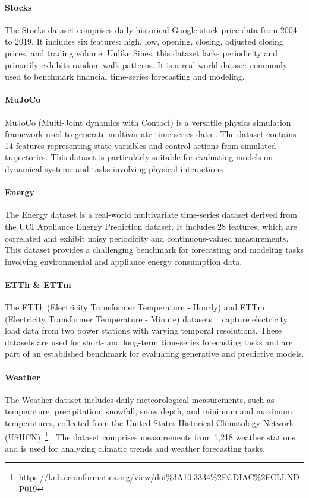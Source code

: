 \documentclass{article}
\theoremstyle{plain}
\theoremstyle{definition}
\theoremstyle{remark}
\begin{document}
\paragraph{Stocks} 
The Stocks dataset comprises daily historical Google stock price data from 2004 to 2019. It includes six features: high, low, opening, closing, adjusted closing prices, and trading volume. Unlike Sines, this dataset lacks periodicity and primarily exhibits random walk patterns. It is a real-world dataset commonly used to benchmark financial time-series forecasting and modeling.

\paragraph{MuJoCo} 
MuJoCo (Multi-Joint dynamics with Contact) is a versatile physics simulation framework used to generate multivariate time-series data \cite{todorov2012mujoco}. The dataset contains 14 features representing state variables and control actions from simulated trajectories. This dataset is particularly suitable for evaluating models on dynamical systems and tasks involving physical interactions 

\paragraph{Energy} 
The Energy dataset is a real-world multivariate time-series dataset \cite{candanedo2017data} derived from the UCI Appliance Energy Prediction dataset. It includes 28 features, which are correlated and exhibit noisy periodicity and continuous-valued measurements. This dataset provides a challenging benchmark for forecasting and modeling tasks involving environmental and appliance energy consumption data.

\paragraph{ETTh \& ETTm} 
The ETTh (Electricity Transformer Temperature - Hourly) and ETTm (Electricity Transformer Temperature - Minute) datasets ~\cite{zhou2021informer} capture electricity load data from two power stations with varying temporal resolutions. These datasets are used for short- and long-term time-series forecasting tasks and are part of an established benchmark for evaluating generative and predictive models.

\paragraph{Weather} 
The Weather dataset includes daily meteorological measurements, such as temperature, precipitation, snowfall, snow depth, and minimum and maximum temperatures, collected from the United States Historical Climatology Network (USHCN)~\footnote{\url{https://knb.ecoinformatics.org/view/doi\%3A10.3334\%2FCDIAC\%2FCLI.NDP019}} . The dataset comprises measurements from 1,218 weather stations and is used for analyzing climatic trends and weather forecasting tasks.
\end{document}
